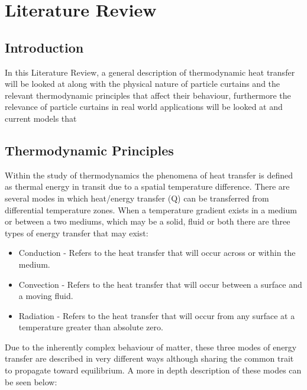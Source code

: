 \documentclass[12pt]{article}
\newcommand{\ts}{\textsuperscript}
\newcommand{\mycite}[1]{\ts{\cite{#1}}}
\begin{document}
\section{Literature Review}



\subsection{Introduction}

In this Literature Review, a general description of thermodynamic heat transfer will be looked at along with the physical nature of particle curtains and the relevant thermodynamic principles that affect their behaviour, furthermore the relevance of particle curtains in real world applications will be looked at and current models that 

\subsection{Thermodynamic Principles} 


Within the study of thermodynamics the phenomena of heat transfer is defined as thermal energy in transit due to a spatial temperature difference\mycite{bergman2011fundamentals}.
There are several modes in which heat/energy transfer (Q) can be transferred from differential temperature zones. When a temperature gradient exists in a medium or between a two mediums, which may be a solid, fluid or both there are three types of energy transfer that may exist: 
\begin{itemize}
	\item Conduction - Refers to the heat transfer that will occur across or within the medium. 
	\item Convection - Refers to the heat transfer that will occur between a surface and a moving fluid. 
	\item Radiation - Refers to the heat transfer that will occur from any surface at a temperature greater than absolute zero. 
\end{itemize}

Due to the inherently complex behaviour of matter, these three modes of energy transfer are described in very different ways although sharing the common trait to propagate toward equilibrium. A more in depth description of these modes can be seen below:  
\end{document}
